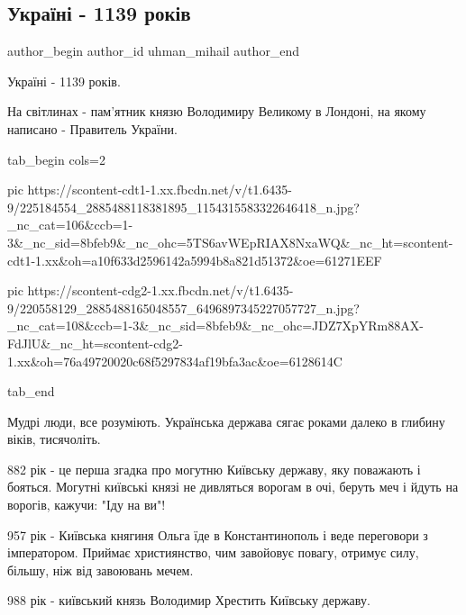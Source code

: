  
 
 
 
 
 
\subsection{Україні - 1139 років}
\label{sec:28_07_2021.fb.uhman_mihail.1.ukraina_1139_rokiv}
 
\ifcmt
 author_begin
   author_id uhman_mihail
 author_end
\fi

Україні - 1139 років.

На світлинах - пам'ятник князю Володимиру   Великому в Лондоні, на якому
написано - Правитель України.

\ifcmt
  tab_begin cols=2

     pic https://scontent-cdt1-1.xx.fbcdn.net/v/t1.6435-9/225184554_2885488118381895_1154315583322646418_n.jpg?_nc_cat=106&ccb=1-3&_nc_sid=8bfeb9&_nc_ohc=5TS6avWEpRIAX8NxaWQ&_nc_ht=scontent-cdt1-1.xx&oh=a10f633d2596142a5994b8a821d51372&oe=61271EEF

     pic https://scontent-cdg2-1.xx.fbcdn.net/v/t1.6435-9/220558129_2885488165048557_6496897345227057727_n.jpg?_nc_cat=108&ccb=1-3&_nc_sid=8bfeb9&_nc_ohc=JDZ7XpYRm88AX-FdJlU&_nc_ht=scontent-cdg2-1.xx&oh=76a49720020c68f5297834af19bfa3ac&oe=6128614C

  tab_end
\fi

Мудрі люди, все розуміють. Українська держава сягає роками далеко в глибину
віків, тисячоліть.

882 рік - це перша згадка про могутню Київську державу, яку поважають і
бояться. Могутні київські князі не дивляться ворогам в очі, беруть меч і йдуть
на ворогів, кажучи: "Іду на ви"! 

957 рік - Київська княгиня Ольга їде в Константинополь і веде переговори з
імператором. Приймає християнство, чим завойовує повагу, отримує силу, більшу,
ніж від завоювань мечем.

988 рік - київський князь Володимир Хрестить Київську державу. 


